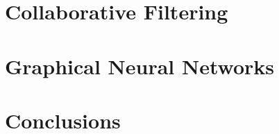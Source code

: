 \documentclass[12pt]{article}
\numberwithin{equation}{section}
\begin{document}
\section{Collaborative Filtering}

\section{Graphical Neural Networks}

\newpage
\section{Conclusions}
\vspace{1em} 



%
%

\newpage
\printbibliography[heading=bibintoc]
\end{document}
